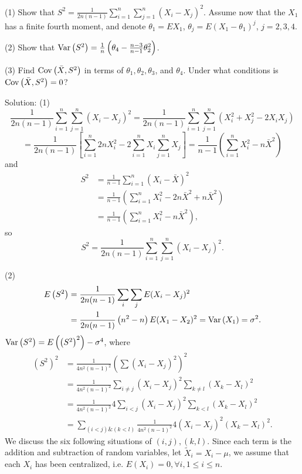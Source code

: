 (1) Show that $S^{2}=\frac{1}{2n(n-1)}\sum_{i=1}^{n}\sum_{j=1}^{n}\left(X_{i}-X_{j}\right)^{2}$. Assume now that the $X_{1}$ has a finite fourth moment, and denote $\theta_{1}=EX_{1}$, $\theta_{j}=E\left(X_{1}-\theta_{1}\right)^{j}$, $j=2,3,4$.

(2) Show that $\operatorname{Var}\left(S^{2}\right)=\frac{1}{n}\left(\theta_{4}-\frac{n-3}{n-1}\theta_{2}^{2}\right)$.

(3) Find $\operatorname{Cov}\left(\bar{X},S^{2}\right)$ in terms of $\theta_{1},\theta_{2},\theta_{3}$, and $\theta_{4}$. Under what conditions is $\operatorname{Cov}\left(\bar{X},S^{2}\right)=0$?

{Solution:}
(1)
\[
\frac{1}{2n(n-1)}\sum_{i=1}^{n}\sum_{j=1}^{n}\left(X_{i}-X_{j}\right)^{2}=\frac{1}{2n(n-1)}\sum_{i=1}^{n}\sum_{j=1}^{n}\left(X_{i}^{2}+X_{j}^{2}-2X_{i}X_{j}\right)
\]
\[
=\frac{1}{2n(n-1)}\left[\sum_{i=1}^{n}2nX_{i}^{2}-2\sum_{i=1}^{n}X_{i}\sum_{j=1}^{n}X_{j}\right]=\frac{1}{n-1}\left(\sum_{i=1}^{n}X_{i}^{2}-n\bar{X}^{2}\right)
\]
and
\begin{align*}
S^{2}&=\frac{1}{n-1}\sum_{i=1}^{n}(X_{i}-\bar{X})^{2}\\
&=\frac{1}{n-1}\left(\sum_{i=1}^{n}X_{i}^{2}-2n\bar{X}^{2}+n\bar{X}^{2}\right)\\
&=\frac{1}{n-1}\left(\sum_{i=1}^{n}X_{i}^{2}-n\bar{X}^{2}\right),
\end{align*}
so
\[
S^{2}=\frac{1}{2n(n-1)}\sum_{i=1}^{n}\sum_{j=1}^{n}(X_{i}-X_{j})^{2}.
\]

(2)
\begin{align*}
E\left(S^{2}\right)&=\frac{1}{2n(n-1)}\sum_{i}\sum_{j}E(X_{i}-X_{j})^{2}\\
&=\frac{1}{2n(n-1)}\left(n^{2}-n\right)E(X_{1}-X_{2})^{2}=\operatorname{Var}\left(X_{1}\right)=\sigma^{2}.
\end{align*}
$\operatorname{Var}\left(S^{2}\right)=E\left(\left(S^{2}\right)^{2}\right)-\sigma^{4}$, where
\begin{align*}
\left(S^{2}\right)^{2}&=\frac{1}{4n^{2}(n-1)^{2}}\left(\sum(X_{i}-X_{j})^{2}\right)^{2}\\
&=\frac{1}{4n^{2}(n-1)^{2}}\sum_{i\neq j}(X_{i}-X_{j})^{2}\sum_{k\neq l}(X_{k}-X_{l})^{2}\\
&=\frac{1}{4n^{2}(n-1)^{2}}4\sum_{i<j}(X_{i}-X_{j})^{2}\sum_{k<l}(X_{k}-X_{l})^{2}\\
&=\sum_{(i<j)\&(k<l)}\frac{1}{4n^{2}(n-1)^{2}}4(X_{i}-X_{j})^{2}(X_{k}-X_{l})^{2}.
\end{align*}
We discuss the six following situations of $(i,j),(k,l)$. Since each term is the addition and subtraction of random variables, let $\tilde{X}_{i}=X_{i}-\mu$, we assume that each $X_{i}$ has been centralized, i.e. $E\left(X_{i}\right)=0,\forall i,1\leq i\leq n$.

